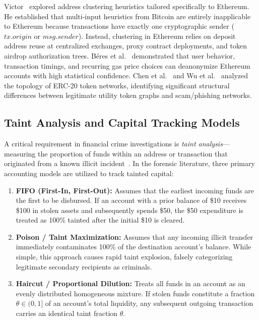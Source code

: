 Victor~\cite{victor2020address} explored address clustering heuristics tailored specifically to Ethereum. He established that multi-input heuristics from Bitcoin are entirely inapplicable to Ethereum because transactions have exactly one cryptographic sender ($tx.origin$ or $msg.sender$). Instead, clustering in Ethereum relies on deposit address reuse at centralized exchanges, proxy contract deployments, and token airdrop authorization trees. B{\'e}res et al.~\cite{beres2021blockchain} demonstrated that user behavior, transaction timings, and recurring gas price choices can deanonymize Ethereum accounts with high statistical confidence. Chen et al.~\cite{chen2020traveling} and Wu et al.~\cite{wu2021tnet} analyzed the topology of ERC-20 token networks, identifying significant structural differences between legitimate utility token graphs and scam/phishing networks.

\subsection{Taint Analysis and Capital Tracking Models}

A critical requirement in financial crime investigations is \emph{taint analysis}---measuring the proportion of funds within an address or transaction that originated from a known illicit incident~\cite{moser2014towards, frantz2021systematic}. In the forensic literature, three primary accounting models are utilized to track tainted capital:

\begin{enumerate}
    \item \textbf{FIFO (First-In, First-Out):} Assumes that the earliest incoming funds are the first to be disbursed. If an account with a prior balance of \$10 receives \$100 in stolen assets and subsequently spends \$50, the \$50 expenditure is treated as 100\% tainted after the initial \$10 is cleared.
    \item \textbf{Poison / Taint Maximization:} Assumes that any incoming illicit transfer immediately contaminates 100\% of the destination account's balance. While simple, this approach causes rapid taint explosion, falsely categorizing legitimate secondary recipients as criminals.
    \item \textbf{Haircut / Proportional Dilution:} Treats all funds in an account as an evenly distributed homogeneous mixture. If stolen funds constitute a fraction $\theta \in (0, 1]$ of an account's total liquidity, any subsequent outgoing transaction carries an identical taint fraction $\theta$.
\end{enumerate}

